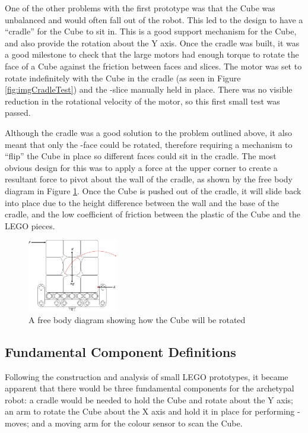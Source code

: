 \documentclass{report}
\newcommand{\face}[1]{\uppercase{\texttt{\formatmovesnospace{#1}}}-face}
\newcommand{\move}[1]{\uppercase{\texttt{\formatmovesnospace{#1}}}-move}
\newcommand{\slice}[1]{\uppercase{\texttt{\formatmovesnospace{#1}}}-slice}
\newcommand{\lego}{LEGO }
\begin{document}
	One of the other problems with the first prototype was that the Cube was unbalanced and would often fall out of the robot. This led to the design to have a \enquote{cradle} for the Cube to sit in. This is a good support mechanism for the Cube, and also provide the rotation about the Y axis. Once the cradle was built, it was a good milestone to check that the large motors had enough torque to rotate the face of a Cube against the friction between faces and slices. The motor was set to rotate indefinitely with the Cube in the cradle (as seen in Figure \ref{fig:imgCradleTest}) and the \slice{l-r} manually held in place. There was no visible reduction in the rotational velocity of the motor, so this first small test was passed.
	
	Although the cradle was a good solution to the problem outlined above, it also meant that only the \face{d} could be rotated, therefore requiring a mechanism to \enquote{flip} the Cube in place so different faces could sit in the cradle. The most obvious design for this was to apply a force at the upper corner to create a resultant force to pivot about the wall of the cradle, as shown by the free body diagram in Figure \ref{fig:dwgCubeFreeBodyDiagram}. Once the Cube is pushed out of the cradle, it will slide back into place due to the height difference between the wall and the base of the cradle, and the low coefficient of friction between the plastic of the Cube and the \lego pieces.
    
	\begin{figure}[H]
    	\centering
   		\includegraphics[width=0.35\textwidth]{Resources/Images/dwgCubeFreeBodyDiagram.png}
   		\caption{A free body diagram showing how the Cube will be rotated}
   		\label{fig:dwgCubeFreeBodyDiagram}
    \end{figure}
    
    \subsection{Fundamental Component Definitions} \label{sec:componentDefinitions}
    
    Following the construction and analysis of small \lego prototypes, it became apparent that there would be three fundamental components for the archetypal robot: a cradle would be needed to hold the Cube and rotate about the Y axis; an arm to rotate the Cube about the X axis and hold it in place for performing \move{d}s; and a moving arm for the colour sensor to scan the Cube.
    
\end{document}
